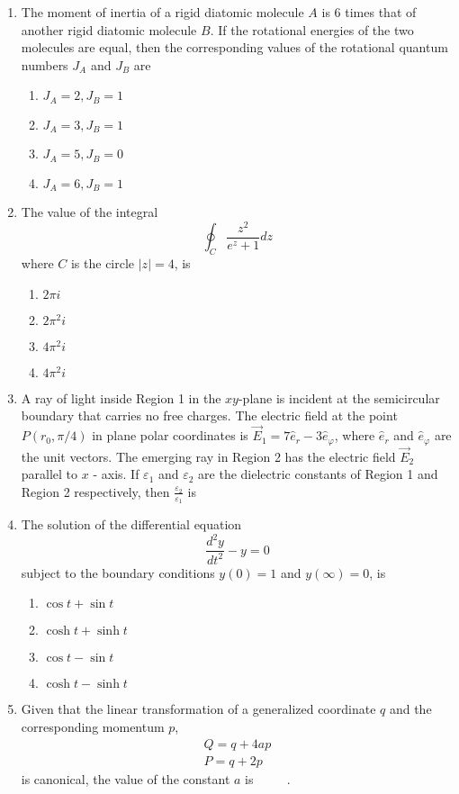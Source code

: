 \documentclass[journal]{IEEEtran}
\begin{document}
\begin{enumerate}
\item The moment of inertia of a rigid diatomic molecule $A$ is 6 times that of another rigid diatomic molecule $B$. If the rotational energies of the two molecules are equal, then the corresponding values of the rotational quantum numbers $J_{{A}}$ and $J_{{B}}$ are
   \begin{multicols}{4}
			\begin{enumerate}
   \item $J_{{A}}=2, J_{{B}}=1$
\item  $J_{{A}}=3, J_{{B}}=1$
\item$J_{{A}}=5, J_{{B}}=0$
\item  $J_{A}=6, J_{B}=1$
\end{enumerate}
		\end{multicols}
  \item The value of the integral
$$
\oint_{C} \frac{z^{2}}{e^{z}+1} d z
$$
where $C$ is the circle $|z|=4$, is
\begin{enumerate}
    \item $2 \pi i$
    \item $2 \pi^{2} i$
    \item $4 \pi^{2} i$
    \item $4 \pi^{2} i$
\end{enumerate}
  \item   A ray of light inside Region 1 in the $x y$-plane is incident at the semicircular boundary that carries no free charges. The electric field at the point $P\left(r_{0}, \pi / 4\right)$ in plane polar coordinates is $\vec{E}_{1}=7 \hat{e}_{r}-3 \hat{e}_{\varphi}$, where $\hat{e}_{r}$ and $\hat{e}_{\varphi}$ are the unit vectors. The emerging ray in Region 2 has the electric field $\vec{E}_{2}$ parallel to $x$ - axis. If $\varepsilon_{1}$ and $\varepsilon_{2}$ are the dielectric constants of Region 1 and Region 2 respectively, then $\frac{\varepsilon_{2}}{\varepsilon_{1}}$ is
  
  
  
\item     The solution of the differential equation
$$
\frac{d^{2} y}{d t^{2}}-y=0
$$
subject to the boundary conditions $y(0)=1$ and $y(\infty)=0$, is
\begin{multicols}{4}
			\begin{enumerate}

\item $\cos t+\sin t$
\item $\cosh t+\sinh t$
\item $\cos t-\sin t$
\item  $\cosh t-\sinh t$
   \end{enumerate}
		\end{multicols}
  \item Given that the linear transformation of a generalized coordinate $q$ and the corresponding momentum $p$,
$$
\begin{gathered}
Q=q+4 a p \\
P=q+2 p
\end{gathered}
$$
is canonical, the value of the constant $a$ is $\qquad$ .


\end{enumerate}
\end{document}
